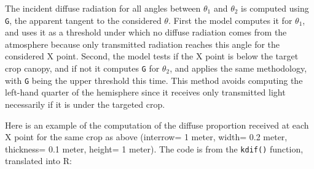 \documentclass[]{book}
\theoremstyle{definition}
\theoremstyle{definition}
\theoremstyle{definition}
\theoremstyle{remark}
\begin{document}
The incident diffuse radiation for all angles between \(\theta_1\) and
\(\theta_2\) is computed using \texttt{G}, the apparent tangent to the
considered \(\theta\). First the model computes it for \(\theta_1\), and
uses it as a threshold under which no diffuse radiation comes from the
atmosphere because only transmitted radiation reaches this angle for the
considered X point. Second, the model tests if the X point is below the
target crop canopy, and if not it computes \texttt{G} for \(\theta_2\),
and applies the same methodology, with \texttt{G} being the upper
threshold this time. This method avoids computing the left-hand quarter
of the hemisphere since it receives only transmitted light necessarily
if it is under the targeted crop.

Here is an example of the computation of the diffuse proportion received
at each X point for the same crop as above (interrow= 1 meter, width=
0.2 meter, thickness= 0.1 meter, height= 1 meter). The code is from the
\texttt{kdif()} function, translated into R:
\end{document}
